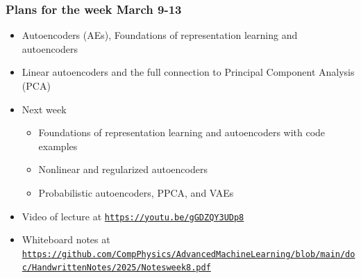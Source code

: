 \documentclass{beamer}
\begin{document}
\begin{frame}
\frametitle{Plans for the week March 9-13}

\begin{block}{}
\begin{itemize}
\item Autoencoders (AEs), Foundations of representation learning and autoencoders

\item Linear autoencoders and the full connection to Principal Component Analysis (PCA)

\item Next week
\begin{itemize}

  \item Foundations of representation learning and autoencoders with code examples

  \item Nonlinear and regularized autoencoders

  \item Probabilistic autoencoders, PPCA, and VAEs

\end{itemize}

\noindent
\item Video of lecture at \href{{https://youtu.be/gGDZQY3UDp8}}{\nolinkurl{https://youtu.be/gGDZQY3UDp8}}

\item Whiteboard notes at \href{{https://github.com/CompPhysics/AdvancedMachineLearning/blob/main/doc/HandwrittenNotes/2025/Notesweek8.pdf}}{\nolinkurl{https://github.com/CompPhysics/AdvancedMachineLearning/blob/main/doc/HandwrittenNotes/2025/Notesweek8.pdf}}
\end{itemize}

\noindent
\end{block}
\end{frame}
\end{document}
